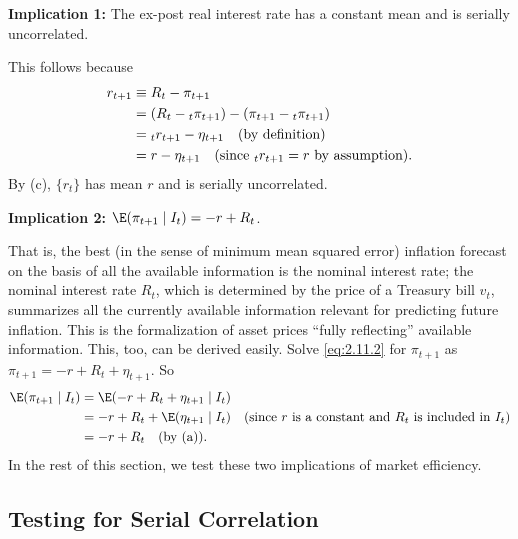 \medskip
\noindent\textbf{Implication 1:}\quad
The ex-post real interest rate has a constant mean and is serially
uncorrelated.

\medskip
This follows because
%
\begin{align}
r_{t+1} &\equiv R_t - \pi_{t+1} \notag \\
&= (R_t - {}_t\pi_{t+1}) - (\pi_{t+1} - {}_t\pi_{t+1}) \notag \\
&= {}_tr_{t+1} - \eta_{t+1} \quad \text{(by definition)} \notag \\
&= r - \eta_{t+1} \quad
  (\text{since } {}_tr_{t+1} = r \text{ by assumption}).
\label{eq:2.11.2}
\end{align}
%
By (c), $\{r_t\}$ has mean $r$ and is serially uncorrelated.

\medskip
\noindent\textbf{Implication 2:}\quad
$\E(\pi_{t+1} \mid I_t) = -r + R_t$.

\medskip
That is, the best (in the sense of minimum mean squared error) inflation forecast on
the basis of all the available information is the nominal interest rate; the nominal
interest rate $R_t$, which is determined by the price of a Treasury bill $v_t$, summarizes all the
currently available information relevant for predicting future inflation. This is the
formalization of asset prices ``fully reflecting'' available information. This, too, can
be derived easily. Solve \eqref{eq:2.11.2} for $\pi_{t+1}$ as
$\pi_{t+1} = -r + R_t + \eta_{t+1}$. So
%
\begin{align}
\E(\pi_{t+1} \mid I_t)
&= \E(-r + R_t + \eta_{t+1} \mid I_t) \notag \\
&= -r + R_t + \E(\eta_{t+1} \mid I_t)
  \quad (\text{since } r \text{ is a constant and } R_t \text{ is included in } I_t) \notag \\
&= -r + R_t \quad \text{(by (a))}.
\label{eq:2.11.3}
\end{align}
%
In the rest of this section, we test these two implications of market efficiency.

\subsection*{Testing for Serial Correlation}

